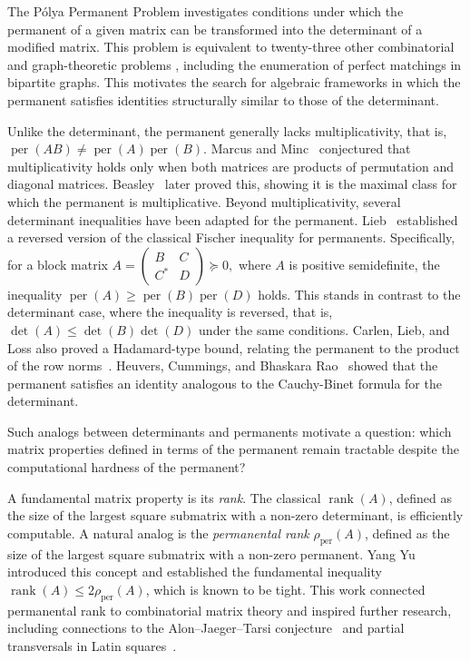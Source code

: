 \documentclass[11pt]{article}
\DeclareMathOperator{\per}{per}
\DeclareMathOperator{\rank}{rank}
\theoremstyle{plain}
\theoremstyle{definition}
\theoremstyle{remark}
\begin{document}
The Pólya Permanent Problem \cite{polya1913aufgabe} investigates conditions under which the permanent of a given matrix can be transformed into the determinant of a modified matrix. This problem is equivalent to twenty-three other combinatorial and graph-theoretic problems \cite{mccuaig2004polya}, including the enumeration of perfect matchings in bipartite graphs. This motivates the search for algebraic frameworks in which the permanent satisfies identities structurally similar to those of the determinant.

Unlike the determinant, the permanent generally lacks multiplicativity, that is, 
\(
\operatorname{per}(AB) \neq \operatorname{per}(A) \operatorname{per}(B)
\).
Marcus and Minc~\cite{marcus1965permanents} conjectured that multiplicativity holds only when both matrices are products of permutation and diagonal matrices. Beasley~\cite{beasley1969maximal} later proved this, showing it is the maximal class for which the permanent is multiplicative. Beyond multiplicativity, several determinant inequalities have been adapted for the permanent. Lieb~\cite{lieb2002proofs} established a reversed version of the classical Fischer inequality for permanents. Specifically, for a block matrix
\(
A = \begin{pmatrix}
B & C \\
C^* & D
\end{pmatrix} \succeq 0,
\)
where \( A \) is positive semidefinite, the inequality 
\(
\operatorname{per}(A) \geq \operatorname{per}(B) \operatorname{per}(D)
\) holds.
This stands in contrast to the determinant case, where the inequality is reversed, that is, \( \det(A) \leq \det(B) \det(D) \) under the same conditions. Carlen, Lieb, and Loss also proved a Hadamard-type bound, relating the permanent to the product of the row norms~\cite{carlen2006inequality}.
Heuvers, Cummings, and Bhaskara Rao~\cite{heuvers1988characterization} showed that the permanent satisfies an identity analogous to the Cauchy-Binet formula for the determinant.


Such analogs between determinants and permanents motivate a question: which matrix properties defined in terms of the permanent remain tractable despite the computational hardness of the permanent?


A fundamental matrix property is its \textit{rank}. The classical $\operatorname{rank}(A)$, defined as the size of the largest square submatrix with a non-zero determinant, is efficiently computable. 
A natural analog is the \textit{permanental rank} $\rho_{\mathrm{per}}(A)$, defined as the size of the largest square submatrix with a non-zero permanent. Yang Yu~\cite{yu1999permanent} introduced this concept and established the fundamental inequality $\rank(A) \leq 2 \rho_{\per}(A)$, which is known to be tight. This work connected permanental rank to combinatorial matrix theory and inspired further research, including connections to the Alon--Jaeger--Tarsi conjecture~\cite{alon1989nowhere} and partial transversals in Latin squares~\cite{fanai2012permanent}.
\end{document}
